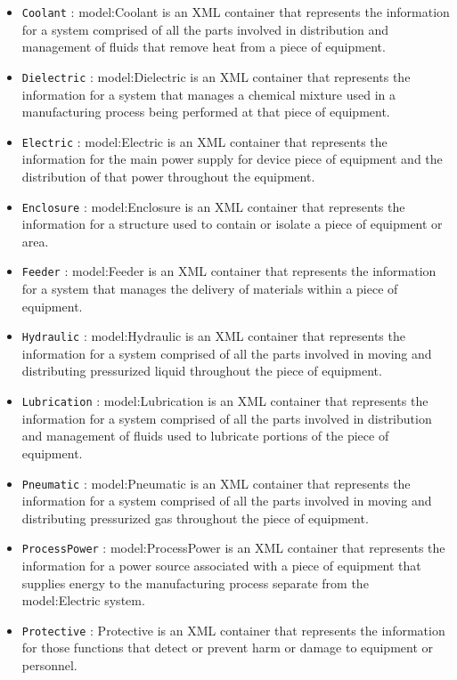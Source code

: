 \begin{itemize}
\item \texttt{Coolant} : {model:Coolant} is an XML container that represents the information for a system comprised of all the parts involved in distribution and management of fluids that remove heat from a piece of equipment.

\item \texttt{Dielectric} : {model:Dielectric} is an XML container that represents the information for a system that manages a chemical mixture used in a manufacturing process being performed at that piece of equipment.

\item \texttt{Electric} : {model:Electric} is an XML container that represents the information for the main power supply for device piece of equipment and the distribution of that power throughout the equipment.

\item \texttt{Enclosure} : {model:Enclosure} is an XML container that represents the information for a structure used to contain or isolate a piece of equipment or area.

\item \texttt{Feeder} : {model:Feeder} is an XML container that represents the information for a system that manages the delivery of materials within a piece of equipment.

\item \texttt{Hydraulic} : {model:Hydraulic} is an XML container that represents the information for a system comprised of all the parts involved in moving and distributing pressurized liquid throughout the piece of equipment.

\item \texttt{Lubrication} : {model:Lubrication} is an XML container that represents the information for a system comprised of all the parts involved in distribution and management of fluids used to lubricate portions of the piece of equipment.

\item \texttt{Pneumatic} : {model:Pneumatic} is an XML container that represents the information for a system comprised of all the parts involved in moving and distributing pressurized gas throughout the piece of equipment.

\item \texttt{ProcessPower} : {model:ProcessPower} is an XML container that represents the information for a power source associated with a piece of equipment that supplies energy to the manufacturing process separate from the {model:Electric} system.

\item \texttt{Protective} : Protective is an XML container that represents the information for those functions that detect or prevent harm or damage to equipment or personnel.

\end{itemize}

\FloatBarrier

